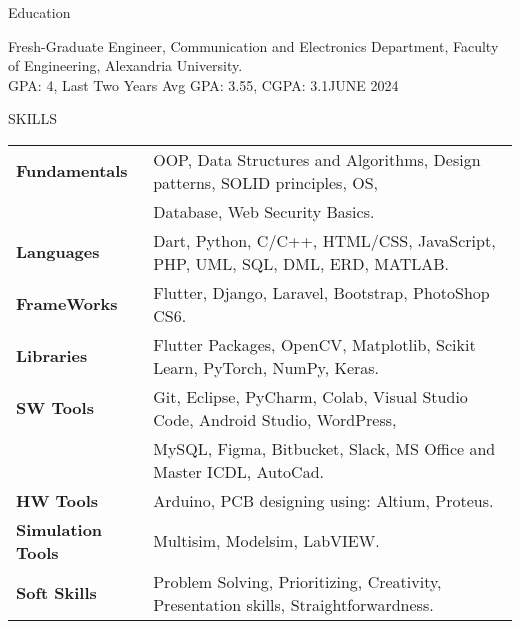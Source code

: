 \documentclass{resume} %
\begin{document}
\begin{rSection}{PROJECTS} 
    \href{https://github.com/AsmaaJAH}{https://github.com/AsmaaJAH }}  
\end{rSection}





\begin{rSection}{Education}

Fresh-Graduate Engineer, Communication and Electronics Department, Faculty of Engineering, Alexandria University.\\ {\small GPA: 4, Last Two Years Avg GPA: 3.55, CGPA: 3.1\hfill {JUNE 2024}}



\end{rSection}


\begin{rSection}{SKILLS}
\begin{tabular}{ @{} >{\bfseries}l @{\hspace{6ex}} l }
Fundamentals & OOP, Data Structures and Algorithms, Design patterns, SOLID principles, OS,\\ & Database, Web Security Basics.\\
Languages & Dart, Python, C/C++, HTML/CSS, JavaScript, PHP, UML, SQL, DML, ERD, MATLAB.\\
FrameWorks &  Flutter, Django, Laravel, Bootstrap,  PhotoShop CS6.\\
Libraries & Flutter Packages, OpenCV, Matplotlib, Scikit Learn, PyTorch, NumPy, Keras.\\
SW Tools & Git, Eclipse, PyCharm, Colab, Visual Studio Code, Android Studio, WordPress,\\ & MySQL, Figma, Bitbucket, Slack, MS Office and Master ICDL, AutoCad.\\
HW Tools & Arduino, PCB designing using: Altium, Proteus.\\
Simulation Tools& Multisim, Modelsim, LabVIEW.\\
Soft Skills &  Problem Solving, Prioritizing, Creativity, Presentation skills, Straightforwardness.\\
\end{tabular}\\
\end{rSection}
\end{document}
